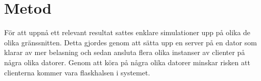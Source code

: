 \section{Metod}
\label{sec:tim-method}

För att uppnå ett relevant resultat sattes enklare simulationer upp på olika de olika gränssnitten. Detta gjordes genom att sätta upp en server på en dator som klarar av mer belasning och sedan ansluta flera olika instanser av clienter på några olika datorer. Genom att köra på några olika datorer minskar risken att clienterna kommer vara flaskhalsen i systemet.
